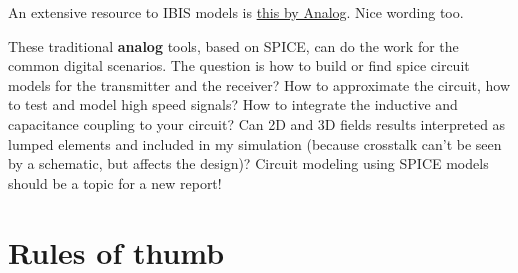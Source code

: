 \documentclass[final]{cubedoc}
\begin{document}
	An extensive resource to IBIS models is \href{https://www.analog.com/media/en/technical-documentation/application-notes/AN-715.pdf}{this by Analog}. Nice wording too.
	
	
	These traditional \textbf{analog} tools, based on SPICE, can do the work for the common digital scenarios. The question is how to build or find spice circuit models for the transmitter and the receiver? How to approximate the circuit, how to test and model high speed signals? How to integrate the inductive and capacitance coupling to your circuit? Can 2D and 3D fields results interpreted as lumped elements and included in my simulation (because crosstalk can't be seen by a schematic, but affects the design)? Circuit modeling using SPICE models should be a topic for a new report!
	
	
	
	\section{Rules of thumb}
	\label{subsec:thumb}
	
\end{document}

